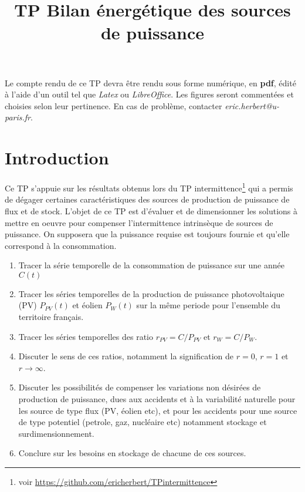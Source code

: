 \documentclass[12pt,a4]{article}
\begin{document}
\title{TP Bilan énergétique des sources de puissance}

\maketitle

Le compte rendu de ce TP devra être rendu sous forme numérique, en \textbf{pdf},
édité à l'aide d'un outil tel que \textit{Latex} ou \textit{LibreOffice}. Les figures seront
commentées et choisies selon leur pertinence.
En cas de problème, contacter \textit{eric.herbert@u-paris.fr}.


\section{Introduction}

Ce TP s'appuie sur les résultats obtenus lors du TP intermittence\footnote{voir \href{https://github.com/ericherbert/TPintermittence}{https://github.com/ericherbert/TPintermittence}} qui a permis de dégager certaines caractéristiques des sources de production de puissance de flux et de stock. L'objet de ce TP est d'évaluer et de dimensionner les solutions à mettre en oeuvre pour compenser l'intermittence intrinsèque de sources de puissance. On supposera que la puissance requise est toujours fournie et qu'elle correspond à la consommation.

\begin{enumerate}
	\item Tracer la série temporelle de la consommation de puissance sur une année $C(t)$
	
	\item Tracer les séries temporelles de la production de puissance photovoltaique (PV) $P_{PV}(t)$ et éolien $P_W(t)$ sur la même periode pour l'ensemble du territoire français.
	
	\item Tracer les séries temporelles des ratio $r_{PV} = C / P_{PV}$ et $r_{W} = C / P_{W}$.
	
	\item Discuter le sens de ces ratios, notamment la signification de $r=0$, $r=1$ et $r \rightarrow \infty$. 
	
	\item Discuter les possibilités de compenser les variations non désirées de production de puissance, dues aux accidents et à la variabilité naturelle pour les source de type flux (PV, éolien etc), et pour les accidents pour une source de type potentiel (petrole, gaz, nucléaire etc) notamment stockage et surdimensionnement.
	
	\item Conclure sur les besoins en stockage de chacune de ces sources. 
\end{enumerate}
\end{document}
